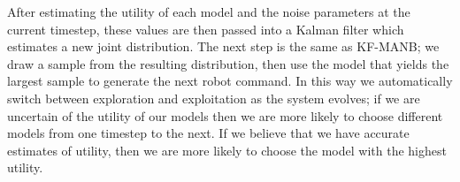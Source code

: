 After estimating the utility of each model and the noise parameters at the current timestep, these values are then passed into a Kalman filter which estimates a new joint distribution. The next step is the same as KF-MANB; we draw a sample from the resulting distribution, then use the model that yields the largest sample to generate the next robot command. In this way we automatically switch between exploration and exploitation as the system evolves; if we are uncertain of the utility of our models then we are more likely to choose different models from one timestep to the next. If we believe that we have accurate estimates of utility, then we are more likely to choose the model with the highest utility.
